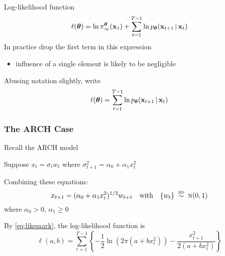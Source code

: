 \begin{frame}

    \vspace{2em}
    Log-likelihood function
    \begin{equation*}
        \ell({\boldsymbol \theta}) =  \ln \pi_{\infty}^{{\boldsymbol \theta}}({\mathbf x}_1) +
            \sum_{t=1}^{T-1} \ln p_{{\boldsymbol \theta}}({\mathbf x}_{t+1} \, | \, {\mathbf x}_t) 
    \end{equation*}
    In practice drop the first term in this expression
    \begin{itemize}
        \item  influence of a single
    element is likely to be negligible
    \end{itemize}
    
    \vspace{.7em}
    Abusing notation slightly, write
    \begin{equation}
        \label{eq:likemark}
        \ell({\boldsymbol \theta}) = \sum_{t=1}^{T-1} \ln p_{{\boldsymbol \theta}}({\mathbf x}_{t+1} \, | \, {\mathbf x}_t) 
    \end{equation}
    
\end{frame}

\begin{frame}\frametitle{The ARCH Case}

    \vspace{2em}
    Recall the ARCH model
    
    Suppose 
    $x_t =
    \sigma_t w_t$ where $\sigma_{t+1}^2 =
    \alpha_0 + \alpha_1 x_t^2$
    
    \vspace{.7em}
    Combining these equations:
    \begin{equation}
        \label{eq:arch}
        x_{t+1} = (\alpha_0 + \alpha_1 x_t^2)^{1/2} w_{t+1}
        \quad \text{with} \quad \{ w_t \} \stackrel {\textrm{ {\sc iid }}} {\sim} \textrm{\sc n}(0,1)
    \end{equation}
    where $\alpha_0 > 0$, $\alpha_1 \geq 0$
    
    \vspace{.7em}
    By \eqref{eq:likemark}, the log-likelihood function is 
    \begin{equation}
        \label{eq:likearch}
        \ell(a, b) = \sum_{t=1}^{T-1} 
         \left\{ 
         - \frac{1}{2} \ln(2 \pi (a + b x_t^2)) - \frac{x_{t+1}^2}{2(a + b x_t^2)} 
            \right\}
    \end{equation}

\end{frame}

